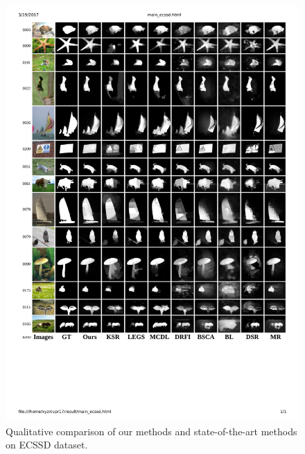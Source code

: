 \documentclass[journal]{IEEEtran}
\begin{document}
\begin{figure}[htbp]
\begin{center}
\includegraphics[width=\linewidth]{cmp_ecssd.pdf}
\end{center}
\vspace{-10pt}
\caption{Qualitative comparison of our methods and state-of-the-art methods on ECSSD dataset.}
\label{cmp_ecssd}
\end{figure}
\end{document}
